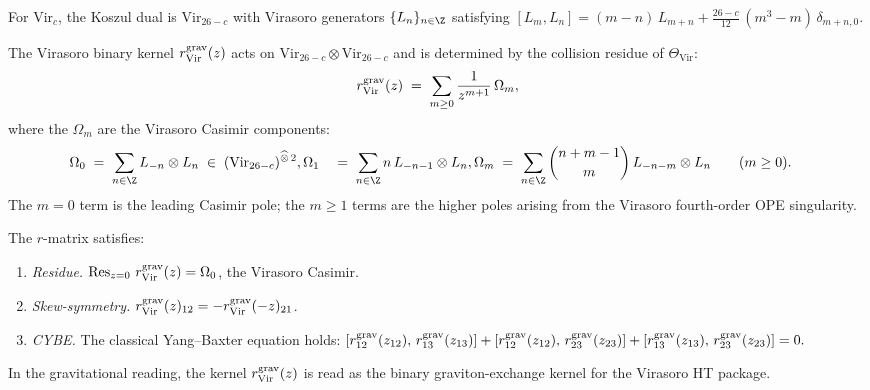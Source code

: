 \begin{construction}
\label{constr:thqg-V-vir-r-explicit}
For $\mathrm{Vir}_c$, the Koszul dual is $\mathrm{Vir}_{26-c}$
with Virasoro generators $\{L_n\}_{n \in \Z}$ satisfying
$[L_m, L_n] = (m-n)\,L_{m+n}
+ \frac{26-c}{12}\,(m^3-m)\,\delta_{m+n,0}$.

The Virasoro binary kernel $r^{\mathrm{grav}}_{\mathrm{Vir}}(z)$ acts on
$\mathrm{Vir}_{26-c} \otimes \mathrm{Vir}_{26-c}$ and is determined
by the collision residue of $\Theta_{\mathrm{Vir}}$:
\begin{equation}%
\rgrav_{\mathrm{Vir}}(z)
\;=\;
\sum_{m \geq 0}
\frac{1}{z^{m+1}}\,
\Omega_m,
\end{equation}
where the $\Omega_m$ are the Virasoro Casimir components:
\begin{align}
\Omega_0
&\;=\;
\sum_{n \in \Z}
L_{-n} \otimes L_n
\;\in\;
(\mathrm{Vir}_{26-c})^{\widehat{\otimes}\,2},
\Omega_1
&\;=\;
\sum_{n \in \Z}
n\,L_{-n-1} \otimes L_n,
\Omega_m
&\;=\;
\sum_{n \in \Z}
\binom{n+m-1}{m}\,L_{-n-m} \otimes L_n
\qquad (m \geq 0).
\end{align}
The $m = 0$ term is the leading Casimir pole; the $m \geq 1$ terms
are the higher poles arising from the Virasoro fourth-order OPE
singularity.

The $r$-matrix satisfies:
\begin{enumerate}[label=\textup{(\roman*)}]
\item \emph{Residue.}\;
 $\operatorname{Res}_{z=0}\,r^{\mathrm{grav}}_{\mathrm{Vir}}(z) = \Omega_0$, the
 Virasoro Casimir.
\item \emph{Skew-symmetry.}\;
 $r^{\mathrm{grav}}_{\mathrm{Vir}}(z)_{12} = -r^{\mathrm{grav}}_{\mathrm{Vir}}(-z)_{21}$.
\item \emph{CYBE.}\;
 The classical Yang--Baxter equation holds:
 $[r^{\mathrm{grav}}_{12}(z_{12}),\,r^{\mathrm{grav}}_{13}(z_{13})]
 + [r^{\mathrm{grav}}_{12}(z_{12}),\,r^{\mathrm{grav}}_{23}(z_{23})]
 + [r^{\mathrm{grav}}_{13}(z_{13}),\,r^{\mathrm{grav}}_{23}(z_{23})]
 = 0.$
\end{enumerate}
\end{construction}

In the gravitational reading, the kernel
$r^{\mathrm{grav}}_{\mathrm{Vir}}(z)$ is read as the binary graviton-exchange
kernel for the Virasoro HT package.

